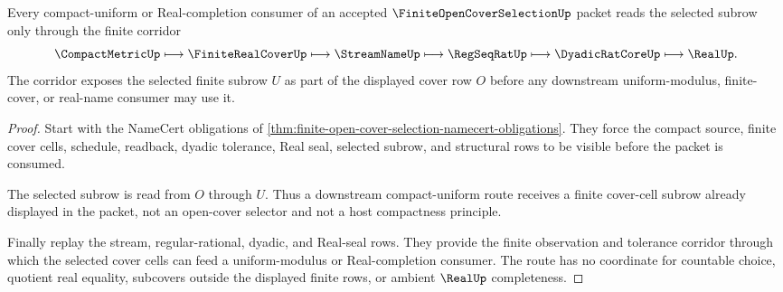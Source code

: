 \begin{theorem}
\label{thm:finite-open-cover-selection-compact-uniform-route}
Every compact-uniform or Real-completion consumer of an accepted $\FiniteOpenCoverSelectionUp$ packet reads the selected subrow only through the finite corridor
$$
\CompactMetricUp\longmapsto\FiniteRealCoverUp\longmapsto\StreamNameUp\longmapsto\RegSeqRatUp\longmapsto\DyadicRatCoreUp\longmapsto\RealUp .
$$
The corridor exposes the selected finite subrow $U$ as part of the displayed cover row $O$ before any downstream uniform-modulus, finite-cover, or real-name consumer may use it.
\end{theorem}
\begin{proof}
Start with the NameCert obligations of \autoref{thm:finite-open-cover-selection-namecert-obligations}. They force the compact source, finite cover cells, schedule, readback, dyadic tolerance, Real seal, selected subrow, and structural rows to be visible before the packet is consumed.

The selected subrow is read from $O$ through $U$. Thus a downstream compact-uniform route receives a finite cover-cell subrow already displayed in the packet, not an open-cover selector and not a host compactness principle.

Finally replay the stream, regular-rational, dyadic, and Real-seal rows. They provide the finite observation and tolerance corridor through which the selected cover cells can feed a uniform-modulus or Real-completion consumer. The route has no coordinate for countable choice, quotient real equality, subcovers outside the displayed finite rows, or ambient $\RealUp$ completeness.
\end{proof}


\begin{closurestatus}{\FiniteOpenCoverSelectionUp}
  \theoryclosure{\seedClosure}
  \formalstatus{\unformalizedV}
\end{closurestatus}
